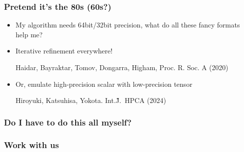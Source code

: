 \documentclass[aspectratio=169]{beamer}
\begin{document}
\begin{frame}
  \frametitle{Pretend it's the 80s (60s?)}
  \begin{itemize}
  \item My algorithm needs 64bit/32bit precision, what do all these fancy
    formats help me?
  \item Iterative refinement everywhere!\\
    {\scriptsize
      \raggedleft
      Haidar, Bayraktar, Tomov, Dongarra, Higham, Proc. R. Soc. A (2020)
      \par}
  \item Or, emulate high-precision scalar with low-precision tensor\\
    {\scriptsize
      \raggedleft
      Hiroyuki, Katsuhisa, Yokota. Int.\~J.~HPCA (2024)
      \par}
  \end{itemize}
\end{frame}
\begin{frame}
  \frametitle{Do I have to do this all myself?}
  
\end{frame}

\begin{frame}
  \frametitle{Work with us}
  
\end{frame}

\end{document}

